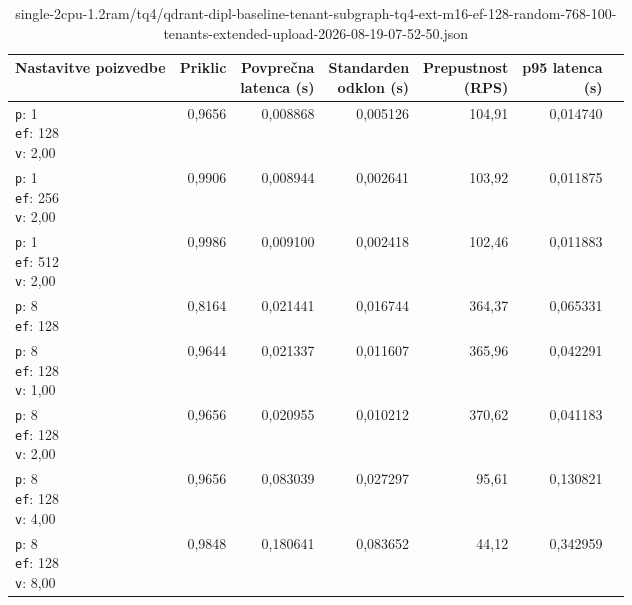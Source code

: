 \begin{table}[htbp]
  \centering
\small
  \caption{single-2cpu-1.2ram/tq4/qdrant-dipl-baseline-tenant-subgraph-tq4-ext-m16-ef-128-random-768-100-tenants-extended-upload-2026-08-19-07-52-50.json}
  \label{tab:single-2cpu-1.2ram:tq4:qdrant-dipl-baseline-tenant-subgraph-tq4-ext-m16-ef-128-random-768-100-tenants-extended-upload-2026-08-19-07-52-50.json}
  \begin{tabularx}{\textwidth}{Xrrrrrr}
    \toprule
    Nastavitve poizvedbe & Priklic & \makecell{Povprečna\\latenca (s)} & \makecell{Standarden\\odklon (s)} & \makecell{Prepustnost\\(RPS)} & \makecell{p95 latenca\\(s)}  \\
    \midrule
    \makecell{\texttt{p}: 1\\\texttt{ef}: 128\\\texttt{v}: 2,00} & 0,9656 & 0,008868 & 0,005126 & 104,91 & 0,014740 \\
    \makecell{\texttt{p}: 1\\\texttt{ef}: 256\\\texttt{v}: 2,00} & 0,9906 & 0,008944 & 0,002641 & 103,92 & 0,011875 \\
    \makecell{\texttt{p}: 1\\\texttt{ef}: 512\\\texttt{v}: 2,00} & 0,9986 & 0,009100 & 0,002418 & 102,46 & 0,011883 \\
    \makecell{\texttt{p}: 8\\\texttt{ef}: 128} & 0,8164 & 0,021441 & 0,016744 & 364,37 & 0,065331 \\
    \makecell{\texttt{p}: 8\\\texttt{ef}: 128\\\texttt{v}: 1,00} & 0,9644 & 0,021337 & 0,011607 & 365,96 & 0,042291 \\
    \makecell{\texttt{p}: 8\\\texttt{ef}: 128\\\texttt{v}: 2,00} & 0,9656 & 0,020955 & 0,010212 & 370,62 & 0,041183 \\
    \makecell{\texttt{p}: 8\\\texttt{ef}: 128\\\texttt{v}: 4,00} & 0,9656 & 0,083039 & 0,027297 & 95,61 & 0,130821 \\
    \makecell{\texttt{p}: 8\\\texttt{ef}: 128\\\texttt{v}: 8,00} & 0,9848 & 0,180641 & 0,083652 & 44,12 & 0,342959 \\

\end{tabularx}
\end{table}
